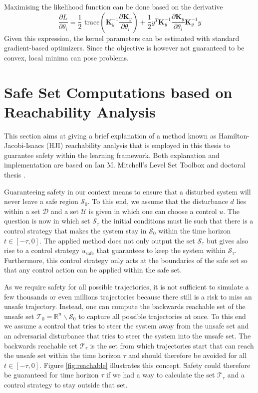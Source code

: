 \documentclass[../main.tex]{subfiles}
\begin{document}
Maximising the likelihood function can be done based on the derivative
\begin{equation}
    \frac{\partial L}{\partial \theta_i} = \dfrac{1}{2} \text{ trace} \left( \mathbf{K}_y^{-1} \frac{\partial \mathbf{K}_y}{\partial \theta_i} \right) + \frac{1}{2}y^T\mathbf{K}_y^{-1} \frac{\partial \mathbf{K}_y}{\partial \theta_i} \mathbf{K}_y^{-1} y
\end{equation}
Given this expression, the kernel parameters can be estimated with standard gradient-based optimizers. Since the objective is however not guaranteed to be convex, local minima can pose problems.

\newpage
\section{Safe Set Computations based on Reachability Analysis}\label{sec:SafeSets}
This section aims at giving a brief explanation of a method known as Hamilton-Jacobi-Isaacs (HJI) reachability analysis that is employed in this thesis to guarantee safety within the learning framework. Both explanation and implementation are based on Ian M. Mitchell's Level Set Toolbox \cite{mitchell2004toolbox} and doctoral thesis \cite{mitchell2003application}.

Guaranteeing safety in our context means to ensure that a disturbed system will never leave a safe region $\mathcal{S}_0$. To this end, we assume that the disturbance $d$ lies within a set $\mathcal{D}$ and a set $\mathcal{U}$ is given in which one can choose a control $u$. The question is now in which set $\mathcal{S}_\tau$ the initial conditions must lie such that there is a control strategy that makes the system stay in $\mathcal{S}_0$ within the time horizon $t \in [-\tau,0]$. The applied method does not only output the set $\mathcal{S}_\tau$ but gives also rise to a control strategy $u_{\text{safe}}$ that guarantees to keep the system within $\mathcal{S}_\tau$. Furthermore, this control strategy only acts at the boundaries of the safe set so that any control action can be applied within the safe set.

As we require safety for all possible trajectories, it is not sufficient to simulate a few thousands or even millions trajectories because there still is a risk to miss an unsafe trajectory. Instead, one can compute the backwards reachable set of the unsafe set $\mathcal{T}_0 = \mathbb{R}^n\backslash \mathcal{S}_0$ to capture all possible trajectories at once. To this end we assume a control that tries to steer the system away from the unsafe set and an adversarial disturbance that tries to steer the system into the unsafe set. The backwards reachable set $\mathcal{T}_\tau$ is the set from which trajectories start that can reach the unsafe set within the time horizon $\tau$ and should therefore be avoided for all $t \in [-\tau,0]$. Figure \ref{fig:reachable} illustrates this concept. Safety could therefore be guaranteed for time horizon $\tau$ if we had a way to calculate the set $\mathcal{T}_\tau$ and a control strategy to stay outside that set. 
\end{document}
